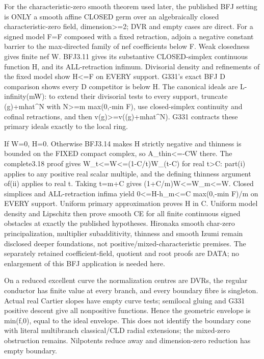 \documentclass[11pt]{article}
\begin{document}
For the characteristic-zero smooth theorem used later, the published BFJ setting is ONLY a smooth affine CLOSED germ over an algebraically closed characteristic-zero field, dimension\textgreater{}=2; DVR and empty cases are direct. For a signed model F=F composed with a fixed retraction, adjoin a negative constant barrier to the max-directed family of nef coefficients below F. Weak closedness gives finite nef W. BFJ3.11 gives its substantive CLOSED-simplex continuous function H, and its ALL-retraction infimum. Divisorial density and refinements of the fixed model show H\textless{}=F on EVERY support. G331's exact BFJ D comparison shows every D competitor is below H. The canonical ideals are L-infinity(mW): to extend their divisorial tests to every support, truncate (g)+mhat\textasciicircum{}N with N\textgreater{}=m max(0,-min F), use closed-simplex continuity and cofinal retractions, and then v(g)\textgreater{}=v((g)+mhat\textasciicircum{}N). G331 contracts these primary ideals exactly to the local ring.

If W=0, H=0. Otherwise BFJ3.14 makes H strictly negative and thinness is bounded on the FIXED compact complex, so A\_thin\textless{}=-CW there. The complete3.18 proof gives W\_t\textless{}=W\textless{}=(1-C/t)W\_(t-C) for real t\textgreater{}C: part(i) applies to any positive real scalar multiple, and the defining thinness argument of(ii) applies to real t. Taking t=m+C gives (1+C/m)W\textless{}=W\_m\textless{}=W. Closed simplices and ALL-retraction infima yield 0\textless{}=H-h\_m\textless{}=C max(0,-min F)/m on EVERY support. Uniform primary approximation proves H in C. Uniform model density and Lipschitz then prove smooth CE for all finite continuous signed obstacles at exactly the published hypotheses. Hironaka smooth char-zero principalization, multiplier subadditivity, thinness and smooth Izumi remain disclosed deeper foundations, not positive/mixed-characteristic premises. The separately retained coefficient-field, quotient and root proofs are DATA; no enlargement of this BFJ application is needed here.

On a reduced excellent curve the normalization centres are DVRs, the regular conductor has finite value at every branch, and every boundary fibre is singleton. Actual real Cartier slopes have empty curve tests; semilocal gluing and G331 positive descent give all nonpositive functions. Hence the geometric envelope is min(f,0), equal to the ideal envelope. This does not identify the boundary cone with literal multibranch classical/CLD radial extensions; the mixed-zero obstruction remains. Nilpotents reduce away and dimension-zero reduction has empty boundary.
\end{document}
